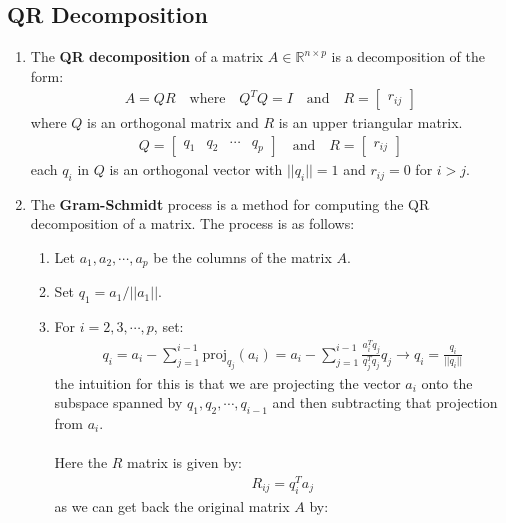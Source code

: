 \documentclass[letterpaper, 11pt]{article}
\newcommand{\R}{\mathbb{R}}	%
\newcommand{\1}{\mathds{1}}	%
\theoremstyle{definition}
\begin{document}
\subsection{QR Decomposition}
\begin{enumerate}
    \item The \textbf{QR decomposition} of a matrix $A \in \R^{n \times p}$ is a decomposition of the form:
    \begin{align}
        A = Q R \quad \text{where} \quad Q^T Q = I \quad \text{and} \quad R = \begin{bmatrix} r_{ij} \end{bmatrix}
    \end{align}
    where $Q$ is an orthogonal matrix and $R$ is an upper triangular matrix. 
    \begin{align}
        Q = \begin{bmatrix} q_1 & q_2 & \cdots & q_p \end{bmatrix} \quad \text{and} \quad R = \begin{bmatrix} r_{ij} \end{bmatrix}
    \end{align}
    each $q_i$ in $Q$ is an orthogonal vector with $||q_i|| = 1$ and $r_{ij} = 0$ for $i > j$.
    \item The \textbf{Gram-Schmidt} process is a method for computing the QR decomposition of a matrix. The process is as follows:
    \begin{enumerate}
        \item Let $a_1, a_2, \cdots, a_p$ be the columns of the matrix $A$.
        \item Set $q_1 = a_1 / ||a_1||$.
        \item For $i = 2,3,\cdots,p$, set:
        \begin{align}
            q_i = a_i - \sum_{j=1}^{i-1}\text{proj}_{q_j}(a_i) = a_i - \sum_{j=1}^{i-1} \frac{a_i^T q_j}{q_j^T q_j} q_j \rightarrow q_i = \frac{q_i}{||q_i||}
        \end{align}
        the intuition for this is that we are projecting the vector $a_i$ onto the subspace spanned by $q_1, q_2, \cdots, q_{i-1}$ and then subtracting that projection from $a_i$. \\ \\
        Here the $R$ matrix is given by:
        \begin{align}
            R_{ij} = q_i^T a_j
        \end{align}
        as we can get back the original matrix $A$ by:
        \begin{align}

\end{align}
\end{enumerate}
\end{enumerate}
\end{document}
